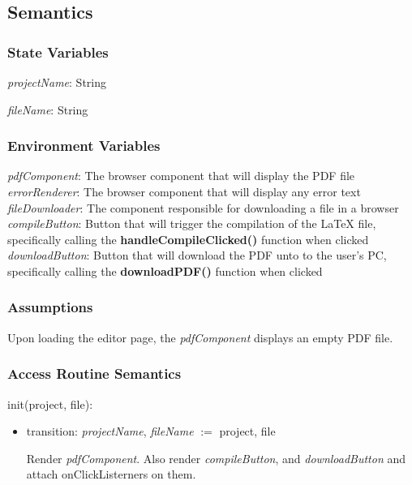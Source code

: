 \documentclass[12pt, titlepage]{article}
\begin{document}
	\subsection{Semantics}
	
	\subsubsection{State Variables}
	
	\textit{projectName}: String
	
	\noindent \textit{fileName}: String
	
	\subsubsection{Environment Variables}
	
	\textit{pdfComponent}: The browser component that will display the PDF file\\
	
	\noindent \textit{errorRenderer}: The browser component that will display any error text\\
	
	\noindent \textit{fileDownloader}: The component responsible for downloading a file in a browser\\
	
	\noindent \textit{compileButton}: Button that will trigger the compilation of the LaTeX file, specifically calling the \textbf{handleCompileClicked()} function when clicked\\
	
	\noindent \textit{downloadButton}: Button that will download the PDF unto to the user's PC, specifically calling the \textbf{downloadPDF()} function when clicked
	
	\subsubsection{Assumptions}
	
	Upon loading the editor page, the \textit{pdfComponent} displays an empty PDF file.
	
	\subsubsection{Access Routine Semantics}
	
	\noindent init(project, file):
	\begin{itemize}
		\item transition: \textit{projectName}, \textit{fileName} $:=$ project, file
		
		\noindent Render \textit{pdfComponent}. Also render \textit{compileButton}, and \textit{downloadButton} and attach onClickListerners on them. 
	\end{itemize}
	
\end{document}

